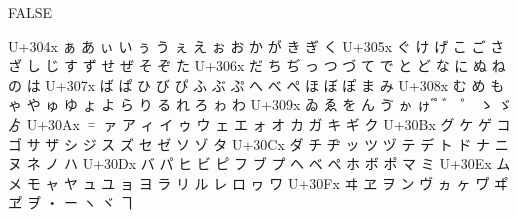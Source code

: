 \documentclass{ltjarticle}\usepackage{luatexja-adjust}
\begin{document}
\large FALSE
{\obeylines\ttfamily
U+304x          ぁ      あ      ぃ      い      ぅ      う      ぇ      え      ぉ      お      か      が      き      ぎ      く
U+305x  ぐ      け      げ      こ      ご      さ      ざ      し      じ      す      ず      せ      ぜ      そ      ぞ      た
U+306x  だ      ち      ぢ      っ      つ      づ      て      で      と      ど      な      に      ぬ      ね      の      は
U+307x  ば      ぱ      ひ      び      ぴ      ふ      ぶ      ぷ      へ      べ      ぺ      ほ      ぼ      ぽ      ま      み
U+308x  む      め      も      ゃ      や      ゅ      ゆ      ょ      よ      ら      り      る      れ      ろ      ゎ      わ
U+309x  ゐ      ゑ      を      ん      ゔ      ゕ      ゖ                      ゙        ゚        ゛      ゜      ゝ      ゞ      ゟ 
U+30Ax  ゠      ァ      ア      ィ      イ      ゥ      ウ      ェ      エ      ォ      オ      カ      ガ      キ      ギ      ク
U+30Bx  グ      ケ      ゲ      コ      ゴ      サ      ザ      シ      ジ      ス      ズ      セ      ゼ      ソ      ゾ      タ
U+30Cx  ダ      チ      ヂ      ッ      ツ      ヅ      テ      デ      ト      ド      ナ      ニ      ヌ      ネ      ノ      ハ
U+30Dx  バ      パ      ヒ      ビ      ピ      フ      ブ      プ      ヘ      ベ      ペ      ホ      ボ      ポ      マ      ミ
U+30Ex  ム      メ      モ      ャ      ヤ      ュ      ユ      ョ      ヨ      ラ      リ      ル      レ      ロ      ヮ      ワ
U+30Fx  ヰ      ヱ      ヲ      ン      ヴ      ヵ      ヶ      ワ゚      ヰ゚      ヱ゚      ヲ゚      ・      ー      ヽ      ヾ      ヿ 
\par}
\end{document}
